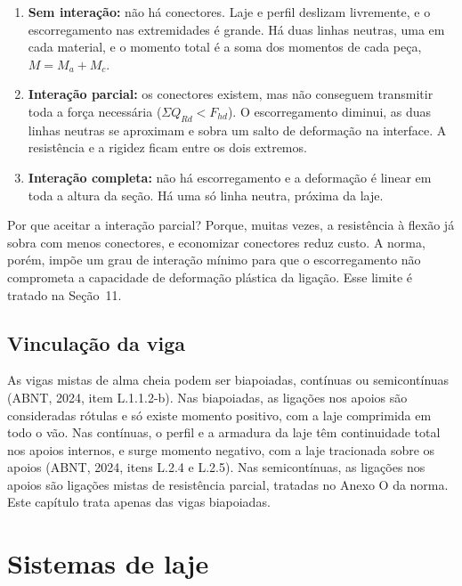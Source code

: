 \documentclass[11pt,a4paper]{article}
\begin{document}
\begin{enumerate}
  \item[(a)] \textbf{Sem interação:} não há conectores. Laje e perfil deslizam livremente, e o escorregamento nas extremidades é grande. Há duas linhas neutras, uma em cada material, e o momento total é a soma dos momentos de cada peça, $M = M_a + M_c$.
  \item[(b)] \textbf{Interação parcial:} os conectores existem, mas não conseguem transmitir toda a força necessária ($\Sigma Q_{Rd} < F_{hd}$). O escorregamento diminui, as duas linhas neutras se aproximam e sobra um salto de deformação na interface. A resistência e a rigidez ficam entre os dois extremos.
  \item[(c)] \textbf{Interação completa:} não há escorregamento e a deformação é linear em toda a altura da seção. Há uma só linha neutra, próxima da laje.
\end{enumerate}

Por que aceitar a interação parcial? Porque, muitas vezes, a resistência à flexão já sobra com menos conectores, e economizar conectores reduz custo. A norma, porém, impõe um grau de interação mínimo para que o escorregamento não comprometa a capacidade de deformação plástica da ligação. Esse limite é tratado na Seção~11.

\subsection{Vinculação da viga}

As vigas mistas de alma cheia podem ser biapoiadas, contínuas ou semicontínuas (ABNT, 2024, item L.1.1.2-b). Nas biapoiadas, as ligações nos apoios são consideradas rótulas e só existe momento positivo, com a laje comprimida em todo o vão. Nas contínuas, o perfil e a armadura da laje têm continuidade total nos apoios internos, e surge momento negativo, com a laje tracionada sobre os apoios (ABNT, 2024, itens L.2.4 e L.2.5). Nas semicontínuas, as ligações nos apoios são ligações mistas de resistência parcial, tratadas no Anexo O da norma. Este capítulo trata apenas das vigas biapoiadas.

\section{Sistemas de laje}
\end{document}
